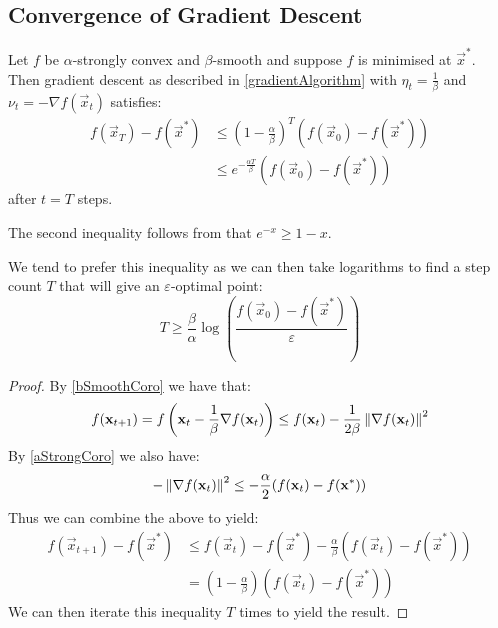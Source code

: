 \documentclass[../main.tex]{subfiles}
\begin{document}
\subsection{Convergence of Gradient Descent}
\begin{theorem}
  Let $f$ be $\alpha$-strongly convex and $\beta$-smooth and suppose $f$ is minimised at $\vec{x}^{*}$.
  Then gradient descent as described in \cref{gradientAlgorithm} with $\eta_t = \frac{1}{\beta}$ and $\nu_t = - \nabla f(\vec{x}_t)$ satisfies:
  \begin{align*}
    f(\vec{x}_T) - f(\vec{x}^{*}) &\leq \left(1 - \frac{\alpha}{\beta}\right)^T (f(\vec{x}_0) - f(\vec{x}^{*})) \\
                                  &\leq e^{-\frac{\alpha T}{\beta}} (f(\vec{x}_0) - f(\vec{x}^{*}))
  \end{align*}
  after $t = T$ steps.
\end{theorem}
\begin{remark}
  The second inequality follows from that $e^{-x} \geq 1- x$.

  We tend to prefer this inequality as we can then take logarithms to find a step count $T$ that will give an $\varepsilon$-optimal point:
  \[
    T \geq \frac{\beta}{\alpha} \log \left(\frac{f(\vec{x}_0) - f(\vec{x}^{*})}{\varepsilon}\right)
  \]
\end{remark}
\begin{proof}
  By \cref{bSmoothCoro} we have that:
  \[
    f(\mathbf{\bm{x}}_{t + 1}) = f\left(\mathbf{\bm{x}}_{t} - \frac{1}{\beta} \nabla f(\mathbf{\bm{x}}_t)\right) \leq f(\mathbf{\bm{x}}_t) - \frac{1}{2\beta}\left\lVert \nabla f(\mathbf{\bm{x}}_t) \right\rVert^2
  \]
  By \cref{aStrongCoro} we also have:
  \[
    - \left\lVert \nabla f(\mathbf{\bm{x}}_t) \right\rVert^2 \leq -\frac{\alpha}{2} (f(\mathbf{\bm{x}}_t) - f(\mathbf{\bm{x}}^{*}))
  \]
  Thus we can combine the above to yield:
  \begin{align*}
    f(\vec{x}_{t + 1}) - f(\vec{x}^{*}) &\leq f(\vec{x}_t) - f(\vec{x}^{*}) - \frac{\alpha}{\beta} (f(\vec{x}_t) - f(\vec{x}^{*}))  \\
                                        &= \left(1 - \frac{\alpha}{\beta}\right) (f(\vec{x}_t) - f(\vec{x}^{*}))
  \end{align*}
  We can then iterate this inequality $T$ times to yield the result.
\end{proof}
\end{document}
